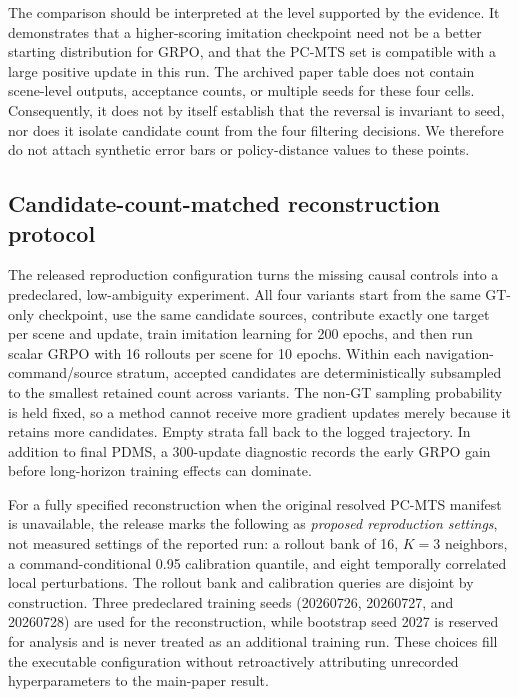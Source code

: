 The comparison should be interpreted at the level supported by the evidence.
It demonstrates that a higher-scoring imitation checkpoint need not be a
better starting distribution for GRPO, and that the PC-MTS set is compatible
with a large positive update in this run.  The archived paper table does not
contain scene-level outputs, acceptance counts, or multiple seeds for these
four cells.  Consequently, it does not by itself establish that the reversal
is invariant to seed, nor does it isolate candidate count from the four
filtering decisions.  We therefore do not attach synthetic error bars or
policy-distance values to these points.

\subsection{Candidate-count-matched reconstruction protocol}
\label{sec:pcmts-matched-protocol}

The released reproduction configuration turns the missing causal controls
into a predeclared, low-ambiguity experiment.  All four variants start from the
same GT-only checkpoint, use the same candidate sources, contribute exactly
one target per scene and update, train imitation learning for 200 epochs, and
then run scalar GRPO with 16 rollouts per scene for 10 epochs.  Within each
navigation-command/source stratum, accepted candidates are deterministically
subsampled to the smallest retained count across variants.  The non-GT
sampling probability is held fixed, so a method cannot receive more gradient
updates merely because it retains more candidates.  Empty strata fall back to
the logged trajectory.  In addition to final PDMS, a 300-update diagnostic
records the early GRPO gain before long-horizon training effects can dominate.

For a fully specified reconstruction when the original resolved PC-MTS
manifest is unavailable, the release marks the following as \emph{proposed
reproduction settings}, not measured settings of the reported run: a rollout
bank of 16, $K=3$ neighbors, a command-conditional 0.95 calibration quantile,
and eight temporally correlated local perturbations.  The rollout bank and
calibration queries are disjoint by construction.  Three predeclared training
seeds (20260726, 20260727, and 20260728) are used for the reconstruction, while
bootstrap seed 2027 is reserved for analysis and is never treated as an additional
training run.  These choices fill the executable configuration without
retroactively attributing unrecorded hyperparameters to the main-paper result.

